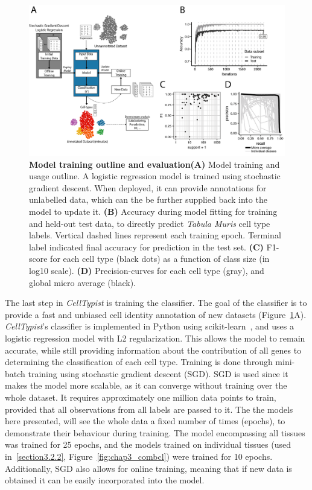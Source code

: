 \begin{figure}[ht!]
    \centering
    \includegraphics[width=1.0\textwidth]{Chapter3/Figs/chap3_model.png} %
    \caption[Model training outline and evaluation]{\textbf{Model training outline and evaluation}\newline\textbf{(A)} Model training and usage outline. A logistic regression model is trained using stochastic gradient descent. When deployed, it can provide annotations for unlabelled data, which can the be further supplied back into the model to update it. \textbf{(B)} Accuracy during model fitting for training and held-out test data, to directly predict \textit{Tabula Muris} cell type labels. Vertical dashed lines represent each training epoch. Terminal label indicated final accuracy for prediction in the test set. \textbf{(C)} F1-score for each cell type (black dots) as a function of class size (in log10 scale). \textbf{(D)} Precision-curves for each cell type (gray), and global micro average (black).}
    \label{fig:chap3_model}
\end{figure}

The last step in \textit{CellTypist} is training the classifier. The goal of the classifier is to provide a fast and unbiased cell identity annotation of new datasets (Figure~\ref{fig:chap3_model}A). \textit{CellTypist}'s classifier is implemented in Python using scikit-learn~\citep{scikit-learn}, and uses a logistic regression model with L2 regularization. This allows the model to remain accurate, while still providing information about the contribution of all genes to determining the classification of each cell type. Training is done through mini-batch training using stochastic gradient descent (SGD). SGD is used since it makes the model more scalable, as it can converge without training over the whole dataset. It requires approximately one million data points to train, provided that all observations from all labels are passed to it. The the models here presented, will see the whole data a fixed number of times (epochs), to demonstrate their behaviour during training. The model encompassing all tissues was trained for 25 epochs, and the models trained on individual tissues (used in~\ref{section3.2.2}, Figure~\ref{fig:chap3_combcl}) were trained for 10 epochs. Additionally, SGD also allows for online training, meaning that if new data is obtained it can be easily incorporated into the model.

